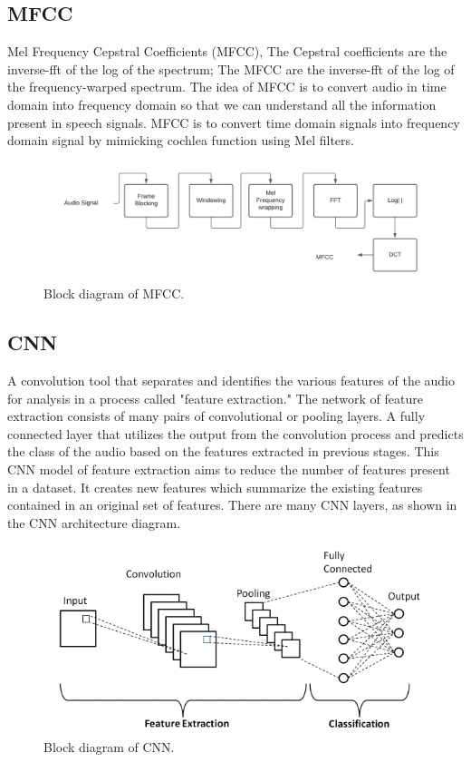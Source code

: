     \subsection{MFCC}
    Mel Frequency Cepstral Coefficients (MFCC), The Cepstral coefficients are the inverse-fft of the log of the spectrum; The MFCC are the inverse-fft of the log of the frequency-warped spectrum. The idea of MFCC is to convert audio in time domain into frequency domain so that we can understand all the information present in speech signals. MFCC is to convert time domain signals into frequency domain signal by mimicking cochlea function using Mel filters.
        \begin{figure}[ht]
        \centering
        \includegraphics[scale=0.48]{images/figure2.png}
        \caption{Block diagram of MFCC.}
        \label{fig:x Block diagram of MFCC.}
        \end{figure}
    
    \subsection{CNN}
    A convolution tool that separates and identifies the various features of the audio for analysis in a process called "feature extraction." The network of feature extraction consists of many pairs of convolutional or pooling layers. A fully connected layer that utilizes the output from the convolution process and predicts the class of the audio based on the features extracted in previous stages. This CNN model of feature extraction aims to reduce the number of features present in a dataset. It creates new features which summarize the existing features contained in an original set of features. There are many CNN layers, as shown in the CNN architecture diagram.
    \begin{figure}[ht]
        \centering
        \includegraphics[scale=1]{images/figure3.png}
        \caption{Block diagram of CNN.}
        \label{fig:x Block diagram of CNN.}
        \end{figure}
